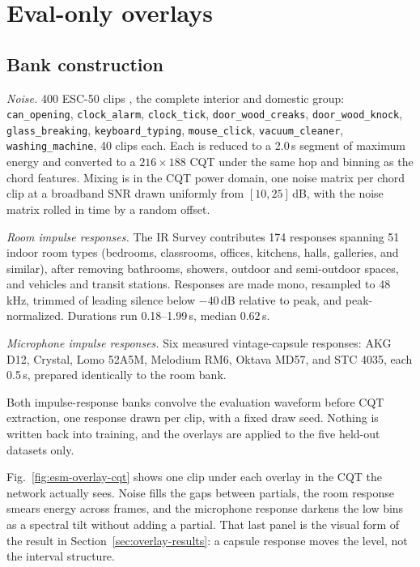 \documentclass[pdflatex,sn-mathphys-num]{sn-jnl}
\begin{document}
\section{Eval-only overlays}\label{sec:overlays}

\subsection{Bank construction}\label{sec:banks}

\emph{Noise.} 400 ESC-50 clips \cite{Piczak2015}, the complete interior and domestic group: \texttt{can\_opening}, \texttt{clock\_alarm}, \texttt{clock\_tick}, \texttt{door\_wood\_creaks}, \texttt{door\_wood\_knock}, \texttt{glass\_breaking}, \texttt{keyboard\_typing}, \texttt{mouse\_click}, \texttt{vacuum\_cleaner}, \texttt{washing\_machine}, 40 clips each. Each is reduced to a 2.0\,s segment of maximum energy and converted to a $216\times188$ CQT under the same hop and binning as the chord features. Mixing is in the CQT power domain, one noise matrix per chord clip at a broadband SNR drawn uniformly from $[10,25]$\,dB, with the noise matrix rolled in time by a random offset.

\emph{Room impulse responses.} The IR Survey \cite{Traer2016} contributes 174 responses spanning 51 indoor room types (bedrooms, classrooms, offices, kitchens, halls, galleries, and similar), after removing bathrooms, showers, outdoor and semi-outdoor spaces, and vehicles and transit stations. Responses are made mono, resampled to 48\,kHz, trimmed of leading silence below $-40$\,dB relative to peak, and peak-normalized. Durations run 0.18--1.99\,s, median 0.62\,s.

\emph{Microphone impulse responses.} Six measured vintage-capsule responses: AKG D12, Crystal, Lomo 52A5M, Melodium RM6, Oktava MD57, and STC 4035, each 0.5\,s, prepared identically to the room bank.

Both impulse-response banks convolve the evaluation waveform before CQT extraction, one response drawn per clip, with a fixed draw seed. Nothing is written back into training, and the overlays are applied to the five held-out datasets only.

Fig.~\ref{fig:esm-overlay-cqt} shows one clip under each overlay in the CQT the network actually sees. Noise fills the gaps between partials, the room response smears energy across frames, and the microphone response darkens the low bins as a spectral tilt without adding a partial. That last panel is the visual form of the result in Section~\ref{sec:overlay-results}: a capsule response moves the level, not the interval structure.
\end{document}

